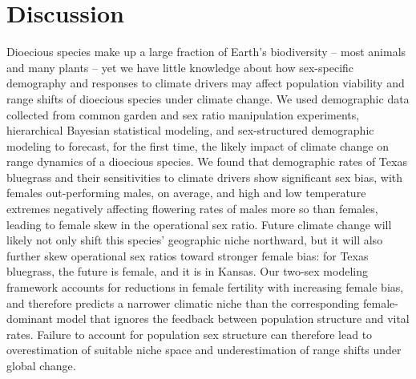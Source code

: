 \documentclass[9pt,twocolumn,twoside,lineno]{pnas-new}
\begin{document}
\section*{Discussion}
Dioecious species make up a large fraction of Earth's biodiversity -- most animals and many plants -- yet we have little knowledge about how sex-specific demography and responses to climate drivers may affect population viability and range shifts of dioecious species under climate change.
We used demographic data collected from common garden and sex ratio manipulation experiments, hierarchical Bayesian statistical modeling, and sex-structured demographic modeling to forecast, for the first time, the likely impact of climate change on range dynamics of a dioecious species.
We found that demographic rates of Texas bluegrass and their sensitivities to climate drivers show significant sex bias, with females out-performing males, on average, and high and low temperature extremes negatively affecting flowering rates of males more so than females, leading to female skew in the operational sex ratio. 
Future climate change will likely not only shift this species' geographic niche northward, but it will also further skew operational sex ratios toward stronger female bias: for Texas bluegrass, the future is female, and it is in Kansas. 
Our two-sex modeling framework accounts for reductions in female fertility with increasing female bias, and therefore predicts a narrower climatic niche than the corresponding female-dominant model that ignores the feedback between population structure and vital rates. 
Failure to account for population sex structure can therefore lead to overestimation of suitable niche space and underestimation of range shifts under global change. 
\end{document}
